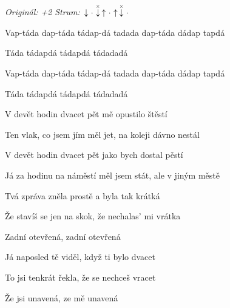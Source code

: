 \begin{song}


\begin{headerbox}
\RaiseBoxWithAccents
{} \quad
\textit{Originál: +2} \quad
\textit{Strum:} $\Down\Miss\ChuckDown\Up\Miss\Up\ChuckDown\Miss$ 
\end{headerbox}

\begin{hchordbox}
\end{hchordbox}

\Large

\bigskip

\begin{chorusbox}{\Refren}
Vap-táda dap-táda tádap-dá tadada dap-táda dádap tapdá \par
Táda tádapdá tádapdá tádadadá  \par
{}Vap-táda dap-táda tádap-dá tadada dap-táda dádap tapdá \par
Táda tádapdá tádapdá tádadadá  \par
\end{chorusbox}

\bigskip

V devět hodin dvacet pět  mě opustilo štěstí \par
Ten vlak, co jsem jím měl jet, na koleji  dávno nestál \par
{}V devět hodin dvacet pět  jako bych dostal pěstí \par
Já za hodinu na náměstí měl jsem stát, ale v jiným městě

\bigskip

Tvá zpráva zněla prostě a byla tak krátká \par
Že stavíš se jen na skok, že nechalas' mi vrátka \par
{}Zadní otevřená, zadní otevřená

\bigskip

Já naposled tě viděl, když ti bylo dvacet \par
{}To jsi tenkrát řekla, že se nechceš vracet \par
{}Že jsi unavená, ze mě unavená \par


\end{song}
